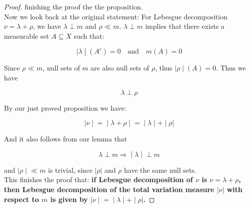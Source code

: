 \documentclass{qlnotes-export}
\begin{document}
\begin{proof}
finishing the proof the the proposition.\\
Now we look back at the original statement: For Lebesgue decomposition \(\nu = \lambda + \rho\), we have \(\lambda \perp m\) and \(\rho \ll m\). \(\lambda \perp m\) implies that there exists a measurable set \(A \subseteq X\) such that:

\[\left. |\lambda \middle| (A^{c}) = 0\quad\text{and}\quad m(A) = 0 \right.\]

Since \(\rho \ll m\), null sets of \(m\) are also null sets of \(\rho\), thus \(\left. |\rho \middle| (A) = 0 \right.\). Thus we have

\[\lambda \perp \rho\]

By our just proved proposition we have:

\[\left. |\nu \middle| = \middle| \lambda + \rho \middle| = \middle| \lambda \middle| + \middle| \rho| \right.\]

And it also follows from our lemma that

\[\left. \lambda \perp m\Longrightarrow \middle| \lambda \middle| \perp m \right.\]

and \(\left. |\rho \middle| \ll m \right.\) is trivial, since \(|\rho|\) and \(\rho\) have the same null sets.\\
This finishes the proof that: \textbf{if Lebesgue decomposition of \(\nu\) is \(\nu = \lambda + \rho\), then Lebesgue decomposition of the total variation measure \(|\nu|\) with respect to \(m\) is given by \(\left. |\nu \middle| = \middle| \lambda \middle| + \middle| \rho| \right.\).}

\end{proof}
\end{document}
